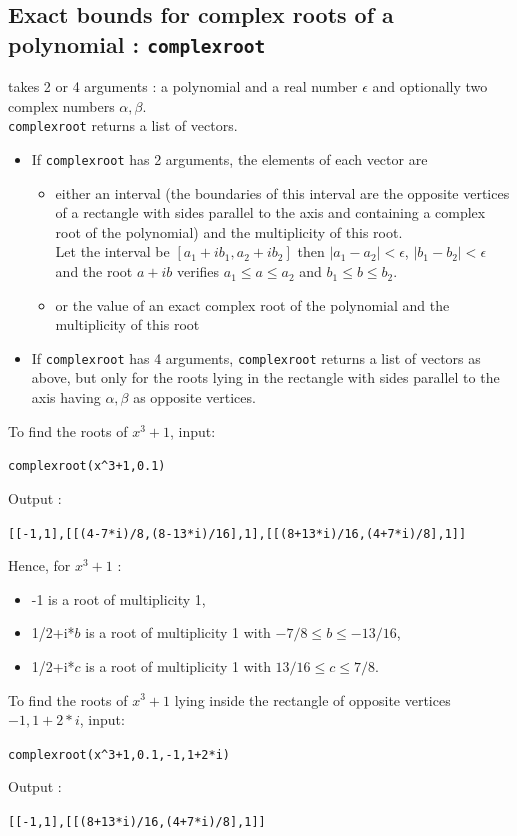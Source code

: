 \documentclass[a4paper,11pt]{book}
\begin{document}
\subsection{Exact bounds for complex roots of a polynomial :
{\tt complexroot}}
 takes 2 or 4 arguments : a polynomial and a real 
number $\epsilon$ and optionally two complex numbers $\alpha,\beta$.\\
{\tt complexroot} returns a list of vectors. 
\begin{itemize}
\item If {\tt complexroot} has 2 arguments, 
the elements of each vector are
\begin{itemize}
\item either an interval (the 
boundaries of this interval are the opposite vertices of a rectangle with sides
parallel to the axis and containing a complex root of the polynomial) and the 
multiplicity of this root.\\
Let the interval be $[a_1+ib_1,a_2+ib_2]$ then $|a_1-a_2|<\epsilon$,  
$|b_1-b_2|<\epsilon$ and the root $a+ib$ verifies 
$a_1\leq a \leq a_2$ and  $b_1\leq b \leq b_2$.
\item or the value of an exact complex root of 
the polynomial and the multiplicity of this root 
\end{itemize}
\item If {\tt complexroot} has 4 arguments, {\tt complexroot} returns a list of
vectors as above, but only for the roots lying in 
the rectangle with sides parallel to the axis having $\alpha,\beta$ as
opposite vertices.\\
\end{itemize}
To find the roots of $x^3+1$, input:
\begin{center}{\tt complexroot(x\verb|^|3+1,0.1)}\end{center}
Output :
\begin{center}{\tt [[-1,1],[[(4-7*i)/8,(8-13*i)/16],1],[[(8+13*i)/16,(4+7*i)/8],1]]}\end{center}
Hence, for  $x^3+1$ :
\begin{itemize}
\item -1 is a root of multiplicity 1, 
\item 1/2+i*$b$ is a root of  multiplicity 1 with  $-7/8\leq b \leq
  -13/16$, 
\item 1/2+i*$c$ is a root of multiplicity 1 with  $13/16\leq c \leq
  7/8$.
\end{itemize}
To find the roots of $x^3+1$ lying inside the rectangle 
of opposite vertices $-1,1+2*i$, input:
\begin{center}{\tt complexroot(x\verb|^|3+1,0.1,-1,1+2*i)}\end{center}
Output :
\begin{center}{\tt [[-1,1],[[(8+13*i)/16,(4+7*i)/8],1]]}\end{center} 
\end{document}
